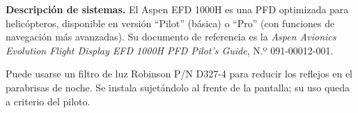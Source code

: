 \textbf{Descripción de sistemas.} El Aspen EFD 1000H es una PFD optimizada para helicópteros, disponible en versión ``Pilot'' (básica) o ``Pro'' (con funciones de navegación más avanzadas). Su documento de referencia es la \emph{Aspen Avionics Evolution Flight Display EFD 1000H PFD Pilot's Guide}, N.º 091-00012-001.

\begin{nota}
Puede usarse un filtro de luz Robinson P/N D327-4 para reducir los reflejos en el parabrisas de noche. Se instala sujetándolo al frente de la pantalla; su uso queda a criterio del piloto.
\end{nota}

